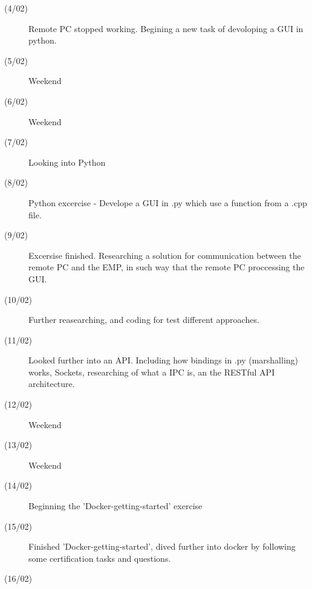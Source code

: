 \begin{description}
\item[(4/02)] Remote PC stopped working. Begining a new task of devoloping a GUI in python.
\item[(5/02)] Weekend
\item[(6/02)] Weekend
\item[(7/02)] Looking into Python
\item[(8/02)] Python excercise - Develope a GUI in .py which use a function from a .cpp file. 
\item[(9/02)] Excersise finished. Researching a solution for communication between the remote PC and the EMP, in such way that the remote PC proccessing the GUI.
\item[(10/02)] Further reasearching, and coding for test different approaches. 
\item[(11/02)] Looked further into an API. Including how bindings in .py (marshalling) works, Sockets, researching of what a IPC is, an the RESTful API architecture.  
\item[(12/02)] Weekend
\item[(13/02)] Weekend
\item[(14/02)] Beginning the 'Docker-getting-started' exercise
\item[(15/02)] Finished 'Docker-getting-started', dived further into docker by following some certification tasks and questions.
\item[(16/02)] 

\end{description}